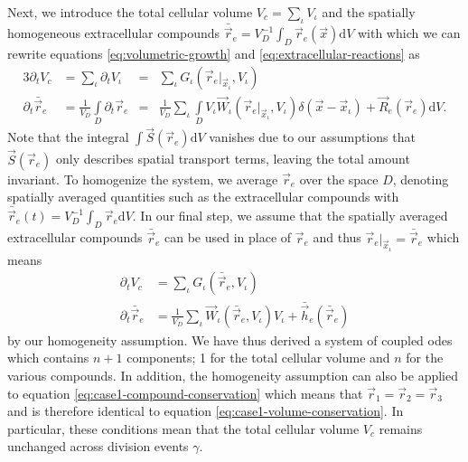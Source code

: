 Next, we introduce the total cellular volume $V_c=\sum_\iota V_\iota$ and the spatially homogeneous
extracellular compounds $\bar{\vec{r}}_e=V_D^{-1}\int_D\vec{r}_e(\vec{x})\text{d}V$ with which we
can rewrite equations \eqref{eq:volumetric-growth} and \eqref{eq:extracellular-reactions} as
\begin{alignat}{3}
    \partial_tV_c&=\sum\limits_\iota\partial_t V_\iota
        &=& \sum\limits_\iota G_\iota(\vec{r}_e|_{\vec{x}_\iota},V_\iota)\\
    \partial_t\bar{\vec{r}}_e&=\frac{1}{V_D}\int\limits_D\partial_t\vec{r}_e
        &=& \frac{1}{V_D}\sum\limits_\iota\int\limits_D V_\iota
            \vec{W}_\iota(\vec{r}_e|_{\vec{x}_\iota},V_\iota)\delta(\vec{x}-\vec{x}_\iota)
            + \vec{R}_e(\vec{r}_e)\text{d}V.
\end{alignat}
Note that the integral $\int\vec{S}(\vec{r}_e)\text{d}V$ vanishes due to our assumptions that
$\vec{S}(\vec{r}_e)$ only describes spatial transport terms, leaving the total amount invariant.
To homogenize the system, we average $\vec{r}_e$ over the space $D$, denoting spatially averaged
quantities such as the extracellular compounds with
$\bar{\vec{r}}_e(t)=V_D^{-1}\int_D\vec{r}_e\text{d}V$.
In our final step, we assume that the spatially averaged extracellular compounds $\bar{\vec{r}}_e$ can
be used in place of $\vec{r}_e$ and thus $\vec{r}_e|_{\vec{x}_\iota}=\bar{\vec{r}}_e$ which means
\begin{align}
    \partial_tV_c &= \sum\limits_\iota G_\iota(\bar{\vec{r}}_e,V_\iota)
    \label{eq:case1-ecr-coarse-grained-1}\\
    \partial_t\bar{\vec{r}}_e &= \frac{1}{V_D}\sum\limits_\iota
        \vec{W}_\iota(\bar{\vec{r}}_e,V_\iota)V_\iota
        +\bar{\vec{h}}_e(\bar{\vec{r}}_e)
    \label{eq:case1-ecr-coarse-grained-2}
\end{align}
by our homogeneity assumption.
We have thus derived a system of coupled \acp{ode} which contains $n+1$ components; 1 for the total
cellular volume and $n$ for the various compounds.
In addition, the homogeneity assumption can also be applied to equation
\eqref{eq:case1-compound-conservation} which means that $\vec{r}_1=\vec{r}_2=\vec{r}_3$ and
is therefore identical to equation \eqref{eq:case1-volume-conservation}.
In particular, these conditions mean that the total cellular volume $V_c$ remains unchanged across
division events $\gamma$.

